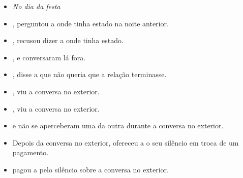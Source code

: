 \begin{itemize}
  \item[] \textit{No dia da festa}

  \item {},  perguntou a  onde tinha estado na noite anterior.
  \item {},  recusou dizer a  onde tinha estado.
  \item {},  e  conversaram lá fora.
  \item {},  disse a  que não queria que a relação terminasse.
  \item {},  viu a conversa no exterior.
  \item {},  viu a conversa no exterior.
  \item {} e  não se aperceberam uma da outra durante a conversa no exterior.
  \item Depois da conversa no exterior,  ofereceu a  o seu silêncio em troca de um pagamento.
  \item {} pagou a  pelo silêncio sobre a conversa no exterior.
\end{itemize}
